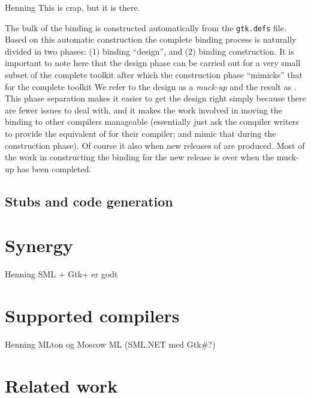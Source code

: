 \documentclass[workingdraft,endnotes]{usetex-v1}
\begin{document}
\begin{ednote}{Henning} This is crap, but it is there. \end{ednote}

The bulk of the \mgtk binding is constructed automatically from the
\texttt{gtk.defs} file. Based on this automatic construction the
complete binding process is naturally divided in two phases: (1)
binding ``design'', and (2) binding construction. It is important to
note here that the design phase can be carried out for a very small
subset of the complete toolkit after which the construction phase
``mimicks'' that for the complete toolkit We refer to the design as a
\emph{muck-up} and the result as \minimgtk. This phase separation
makes it easier to get the design right simply because there are fewer
issues to deal with, and it makes the work involved in moving the
binding to other \sml compilers manageable (essentially just ask the
compiler writers to provide the equivalent of \minimgtk for their
compiler; and mimic that during the construction phase). Of course it
also when new releases of \gtk are produced. Most of the work in
constructing the binding for the new release is over when the muck-up
has been completed.


\subsection{Stubs and code generation}
\label{sec:stubs-code-gener}





\section{Synergy}
\label{sec:synergy}

\begin{ednote}{Henning}
  SML + Gtk+ er godt
\end{ednote}



\section{Supported \sml compilers}
\label{sec:supp-sml-comp}

\begin{ednote}{Henning}
  MLton og Moscow ML (SML.NET med Gtk\#?)
\end{ednote}


\section{Related work}
\label{sec:related-work}
\end{document}
